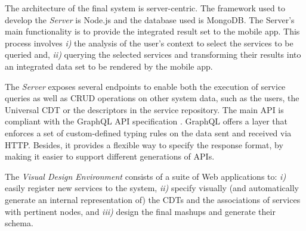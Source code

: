 \label{subsec:architecture}

The architecture of the final system is server-centric. The framework used to develop the \emph{Server} is Node.js and the database used is MongoDB. The Server's main functionality is to provide the integrated result set to the
mobile app. This process involves \emph{i)} the analysis of the user's context
to select the services to be queried and, \emph{ii)}
querying the selected services and transforming their results into
an integrated data set to be rendered by the mobile app.

%
%

The \emph{Server} exposes several endpoints to enable both the execution of service queries as well as CRUD operations on other system data, such as the users, the Universal CDT or the descriptors in the service repository. 
The main API is compliant with the {GraphQL API specification} \cite{docs:specs/facebook/graphql}.
GraphQL offers a layer that enforces a set of custom-defined typing
rules on the data sent and received via HTTP. Besides, it provides a
flexible way to specify the response format, by making it easier to
support different generations of APIs.

The \emph{Visual Design Environment} consists of a suite of Web
applications to: \emph{i)} easily register new services to
the system, \emph{ii)} specify visually (and automatically generate an internal representation of) the CDTs and the
associations of services with pertinent nodes, %
and \emph{iii)} design the final mashups and generate their
schema. %

